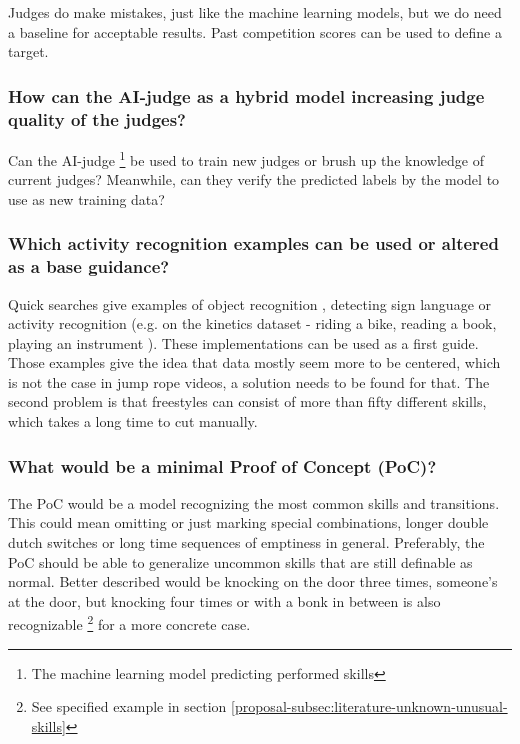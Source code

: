 Judges do make mistakes, just like the machine learning models, but we do need a baseline for acceptable results. Past competition scores can be used to define a target.

\subsubsection{How can the AI-judge as a hybrid model increasing judge quality of the judges?}
\label{proposal-subsubsec:proposal-intro-question-hybrid-model-judge-quality}
Can the AI-judge \footnote{The machine learning model predicting performed skills} be used to train new judges or brush up the knowledge of current judges? Meanwhile, can they verify the predicted labels by the model to use as new training data?

\subsubsection{Which activity recognition examples can be used or altered as a base guidance?}
\label{proposal-subsubsec:proposal-intro-question-earlier-research-guidance}

Quick searches give examples of object recognition \autocite{Diwaker_2022}, detecting sign language \autocite{Bora_2023} or activity recognition (e.g. on the kinetics dataset - riding a bike, reading a book, playing an instrument \autocite{Kay2017}).
These implementations can be used as a first guide.
Those examples give the idea that data mostly seem more to be centered, which is not the case in jump rope videos, a solution needs to be found for that. The second problem is that freestyles can consist of more than fifty different skills, which takes a long time to cut manually.


\subsubsection{What would be a minimal Proof of Concept (PoC)?}
\label{proposal-subsubsec:proposal-intro-question-poc}

The PoC would be a model recognizing the most common skills and transitions.
This could mean omitting or just marking special combinations, longer double dutch switches or long time sequences of emptiness in general. Preferably, the PoC should be able to generalize uncommon skills that are still definable as normal. Better described would be knocking on the door three times, someone's at the door, but knocking four times or with a bonk in between is also recognizable \footnote{See specified example in section \ref{proposal-subsec:literature-unknown-unusual-skills}} for a more concrete case.

